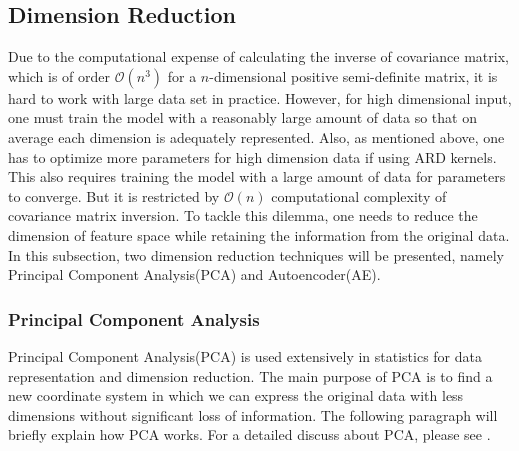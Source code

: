 \documentclass[11pt,a4paper]{article}
\theoremstyle{definition}
\numberwithin{equation}{section}
\begin{document}
	\subsection{Dimension Reduction}
	Due to the computational expense of calculating the inverse of covariance matrix, which is of order $\mathcal O(n^3)$ for a $n$-dimensional positive semi-definite matrix, it is hard to work with large data set in practice. However, for high dimensional input, one must train the model with a reasonably large amount of data so that on average each dimension is adequately represented. Also, as mentioned above, one has to optimize more parameters for high dimension data if using ARD kernels. This also requires training the model with a large amount of data for parameters to converge. But it is restricted by $\mathcal O(n)$ computational complexity of covariance matrix inversion. To tackle this dilemma, one needs to reduce the dimension of feature space while retaining the information from the original data. In this subsection, two dimension reduction techniques will be presented, namely Principal Component Analysis(PCA) and Autoencoder(AE). 
	
	\subsubsection{Principal Component Analysis}
	Principal Component Analysis(PCA) is used extensively in statistics for data representation and dimension reduction. The main purpose of PCA is to find a new coordinate system in which we can express the original data with less dimensions without significant loss of information. The following paragraph will briefly explain how PCA works. For a detailed discuss about PCA, please see \cite[Jolliffe]{Jolliffe}.
	
\end{document}
